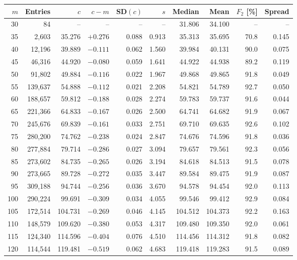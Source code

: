 \begin{center}\fontsize{8.5}{10.5}\selectfont\setlength{\tabcolsep}{3.1pt}
\begin{tabular}{rrrrrrrrrr}\toprule
$m$ & Entries & $c$ & $c-m$ & SD$(c)$ & $s$ & Median & Mean & $F_2$ [\%] & Spread\\\midrule
30 & 84 & -- & -- & -- & -- & 31.806 & 34.100 & -- & --\\
35 & 2,603 & 35.276 & $+0.276$ & 0.088 & 0.913 & 35.313 & 35.695 & 70.8 & 0.145\\
40 & 12,196 & 39.889 & $-0.111$ & 0.062 & 1.560 & 39.984 & 40.131 & 90.0 & 0.075\\
45 & 46,316 & 44.920 & $-0.080$ & 0.059 & 1.641 & 44.922 & 44.938 & 89.2 & 0.119\\
50 & 91,802 & 49.884 & $-0.116$ & 0.022 & 1.967 & 49.868 & 49.865 & 91.8 & 0.049\\
55 & 139,637 & 54.888 & $-0.112$ & 0.021 & 2.208 & 54.821 & 54.789 & 92.7 & 0.050\\
60 & 188,657 & 59.812 & $-0.188$ & 0.028 & 2.274 & 59.783 & 59.737 & 91.6 & 0.044\\
65 & 221,366 & 64.833 & $-0.167$ & 0.026 & 2.500 & 64.741 & 64.682 & 91.9 & 0.067\\
70 & 245,676 & 69.839 & $-0.161$ & 0.033 & 2.751 & 69.710 & 69.635 & 92.6 & 0.102\\
75 & 280,200 & 74.762 & $-0.238$ & 0.024 & 2.847 & 74.676 & 74.596 & 91.8 & 0.036\\
80 & 277,884 & 79.714 & $-0.286$ & 0.027 & 3.094 & 79.657 & 79.561 & 92.3 & 0.056\\
85 & 273,602 & 84.735 & $-0.265$ & 0.026 & 3.194 & 84.618 & 84.513 & 91.5 & 0.078\\
90 & 273,665 & 89.728 & $-0.272$ & 0.035 & 3.447 & 89.584 & 89.475 & 91.9 & 0.087\\
95 & 309,188 & 94.744 & $-0.256$ & 0.036 & 3.670 & 94.578 & 94.454 & 92.0 & 0.113\\
100 & 290,224 & 99.691 & $-0.309$ & 0.034 & 4.055 & 99.546 & 99.412 & 92.9 & 0.084\\
105 & 172,514 & 104.731 & $-0.269$ & 0.046 & 4.145 & 104.512 & 104.373 & 92.2 & 0.163\\
110 & 148,579 & 109.620 & $-0.380$ & 0.053 & 4.317 & 109.480 & 109.350 & 92.0 & 0.061\\
115 & 124,340 & 114.596 & $-0.404$ & 0.076 & 4.510 & 114.456 & 114.312 & 91.8 & 0.082\\
120 & 114,544 & 119.481 & $-0.519$ & 0.062 & 4.683 & 119.418 & 119.283 & 91.5 & 0.089\\

\end{tabular}
\end{center}
